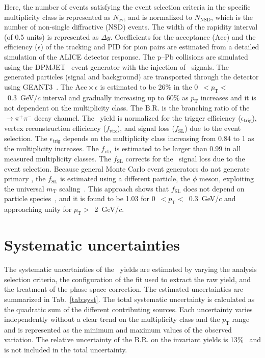 Here, the number of events satisfying the event selection criteria in the specific multiplicity class is represented as $N_{\mathrm{evt}}$ and is normalized to $N_{\mathrm{NSD}}$, which is the number of non-single diffractive (NSD) events. The width of the rapidity interval (of 0.5 units) is represented as $\Delta y$. Coefficients for the acceptance ($\mathrm{Acc}$) and the efficiency ($\epsilon$) of the tracking and PID for pion pairs are estimated from a detailed simulation of the ALICE detector response. The p--Pb collisions are simulated using the DPMJET~\cite{Fedynitch:2015kcn} event generator with the injection of \fzero~signals. The generated particles (signal and background) are transported through the detector using GEANT3~\cite{Brun:1994aa}. The $\mathrm{Acc}\times\epsilon$ is estimated to be 26\% in the 0~$<p_{\mathrm{T}}<$~0.3~GeV/$c$ interval and gradually increasing up to 60\% as $p_{\mathrm{T}}$ increases and it is not dependent on the multiplicity class. The $\mathrm{B.R.}$ is the branching ratio of the \fzero~$\rightarrow \pi^{+}\pi^{-}$ decay channel. The \fzero~yield is normalized for the trigger efficiency ($\epsilon_{\mathrm{trig}}$), vertex reconstruction efficiency ($f_{\mathrm{vtx}}$), and signal loss ($f_{\mathrm{SL}}$) due to the event selection. The $\epsilon_{\mathrm{trig}}$ depends on the multiplicity class increasing from 0.84 to 1 as the multiplicity increases. The $f_{\mathrm{vtx}}$ is estimated to be larger than 0.99 in all measured multiplicity classes. The $f_{\mathrm{SL}}$ corrects for the \fzero~signal loss due to the event selection. Because general Monte Carlo event generators do not generate primary \fzero, the $f_{\mathrm{SL}}$ is estimated using a different particle, the $\phi$ meson, exploiting the universal $m_{\mathrm{T}}$ scaling~\cite{Altenkamper:2017qot}. This approach shows that $f_{\mathrm{SL}}$ does not depend on particle species~\cite{ALICE:2019xyr}, and it is found to be 1.03 for 0~$<p_{\mathrm{T}}<$~0.3~GeV/$c$ and approaching unity for $p_{\mathrm{T}}>$~2~GeV/$c$.

\section{Systematic uncertainties}
\label{sec:syst}
The systematic uncertainties of the \fzero~yields are estimated by varying the analysis selection criteria, the configuration of the fit used to extract the raw yield, and the treatment of the phase space correction. The estimated uncertainties are summarized in Tab.~\ref{tab:syst}. The total systematic uncertainty is calculated as the quadratic sum of the different contributing sources. Each uncertainty varies independently without a clear trend on the multiplicity class and the $p_{\mathrm{T}}$ range and is represented as the minimum and maximum values of the observed variation. The relative uncertainty of the $\mathrm{B.R.}$ on the invariant yields is 13\%~\cite{Stone:2013eaa} and is not included in the total uncertainty.

